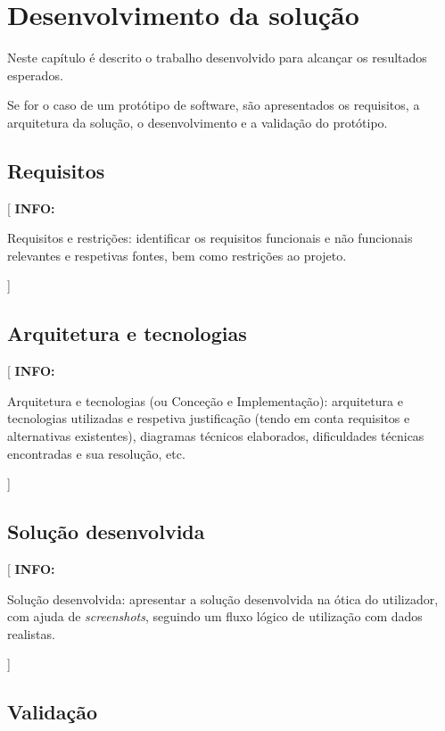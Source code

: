 \documentclass[11pt,a4paper]{report}
\newenvironment{info}[1]{\vspace*{6mm}\color{blue}[ \textbf{INFO:} \begin{em} #1}
                        {\vspace*{3mm}\end{em} ]}
\begin{document}

\chapter{Desenvolvimento da solução}

Neste capítulo é descrito o trabalho desenvolvido para alcançar os
resultados esperados.

Se for o caso de um protótipo de software, são apresentados os
requisitos, a arquitetura da solução, o desenvolvimento e a validação
do protótipo.

\section{Requisitos}

\begin{info}
Requisitos e restrições: identificar os requisitos funcionais e não
funcionais relevantes e respetivas fontes, bem como restrições ao projeto. 
\end{info}

\section{Arquitetura e tecnologias}

\begin{info}
Arquitetura e tecnologias (ou Conceção e Implementação): arquitetura e
tecnologias utilizadas e respetiva justificação (tendo em conta
requisitos e alternativas existentes), diagramas técnicos elaborados,
dificuldades técnicas encontradas e sua resolução, etc. 
\end{info}

\section{Solução desenvolvida}

\begin{info}
Solução desenvolvida: apresentar a solução desenvolvida na ótica do
utilizador, com ajuda de \emph{screenshots}, seguindo um fluxo lógico
de utilização com dados realistas.
\end{info}

\section{Validação}
\end{document}
